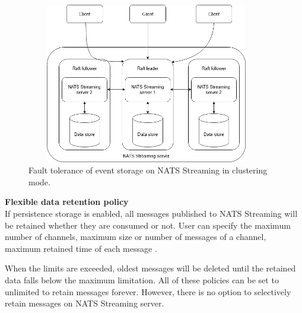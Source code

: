 \begin{figure}[h]
	\centering
	\includegraphics[width=10.5cm,height=7cm]{images/ft-eventstorage-nats.png}
	\caption{Fault tolerance of event storage on NATS Streaming in clustering mode.}
	\label{fig:natsftstorage}
\end{figure}

\textbf{Flexible data retention policy}\\
If persistence storage is enabled, all messages published to NATS Streaming will be retained whether they are consumed or not. User can specify the maximum number of channels, maximum size or number of messages of a channel, maximum retained time of each message \cite{natsconfiguring}.

When the limits are exceeded, oldest messages will be deleted until the retained data falls below the maximum limitation. All of these policies can be set to unlimited to retain messages forever. However, there is no option to selectively retain messages on NATS Streaming server.







